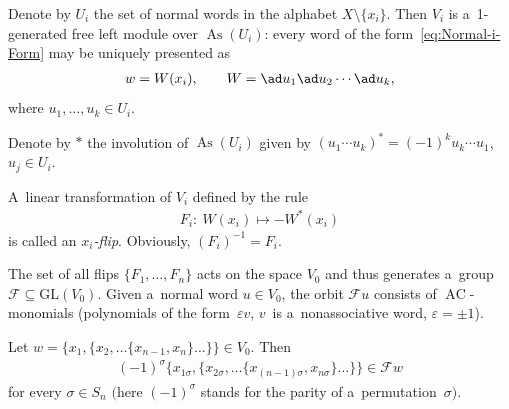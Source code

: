 Denote by $U_i$ the set of normal words in the alphabet $X\setminus \{x_i\} $.
Then $V_i$ is a~1-generated free left module over $\operatorname{As}(U_i)$: every word of the form~\eqref{eq:Normal-i-Form} may be
uniquely presented as
\begin{gather*}
w = W(x_i),
\qquad
W=\ad u_1 \ad u_2 \cdots \ad u_k,
\end{gather*}
where $u_1,\dots, u_k \in U_i$.

Denote by $*$ the involution of $\operatorname{As}(U_i)$ given by $(u_1\cdots u_k)^* = (-1)^{k}u_k\cdots u_1$, $u_j\in U_i$.

\begin{definition}
\label{defn:x_i-flip}
A~linear transformation of $V_i$ def\/ined by the rule
\begin{gather*}
F_i: \ W(x_i) \mapsto -W^*(x_i)
\end{gather*}
is called an {\em $x_i$-flip}.
Obviously, $(F_i)^{-1}=F_i$.
\end{definition}

The set of all f\/lips $\{F_1,\dots, F_n\}$ acts on the space $V_0$ and thus generates a~group $\mathcal F\subseteq
\mathrm{GL}(V_0)$.
Given a~normal word $u\in V_0$, the orbit $\mathcal Fu$ consists of $\operatorname{AC}$-monomials (polynomials of the form~$\varepsilon v$, $v$~is a~nonassociative word, $\varepsilon =\pm 1$).

\begin{lemma}
\label{lem:FlipsGenerateS_n}
Let $w = \{x_1,\{x_2, \dots \{x_{n-1},x_n\}\dots \}\}\in V_0$.
Then
\begin{gather*}
(-1)^\sigma \{x_{1\sigma},\{x_{2\sigma}, \dots \{x_{(n-1)\sigma},x_{n\sigma}\}\dots \}\}\in \mathcal Fw
\end{gather*}
for every $\sigma \in S_n$ $($here $(-1)^\sigma $ stands for the parity of a~permutation~$\sigma)$.
\end{lemma}

